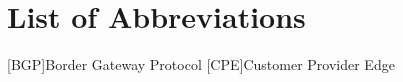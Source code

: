
\chapter{List of Abbreviations}
\begin{acronym}[CPE] %
    [BGP]{Border Gateway Protocol}
    [CPE]{Customer Provider Edge}
\end{acronym}
